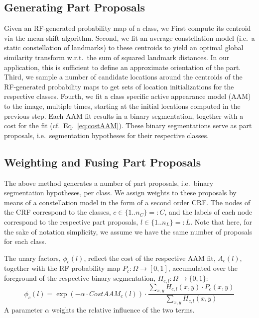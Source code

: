\documentclass[10pt,twocolumn,letterpaper]{article}
\begin{document}
\subsection{Generating Part Proposals}
\label{subsec:hyps}
%
Given an RF-generated probability map of a class, we
First compute its centroid via the mean shift algorithm. 
%
Second, we fit an average constellation model (i.e.\ a static constellation of landmarks) to these centroids to yield an optimal global similarity transform w.r.t.\ the sum of squared landmark distances. In our application, this is sufficient to define an approximate orientation of the part. 
%
Third, we sample a number of candidate locations around the centroids of the RF-generated probability maps to get sets of location initializations for the respective classes. 
%
Fourth, we fit a class specific active appearance model (AAM) to the image, multiple times, starting at the initial locations computed in the previous step. 
%
Each AAM fit results in a binary segmentation, together with a cost for the fit (cf.\ Eq.\ \eqref{eq:costAAM}). 
%
These binary segmentations serve as part proposals, i.e.\ segmentation hypotheses for their respective classes. 

\subsection{Weighting and Fusing Part Proposals}
\label{subsec:weightsAndFusion}

The above method generates a number of part proposals, i.e.\ binary segmentation hypotheses, per class. 
%
We assign weights to these proposals by means of a constellation model in the form of a second order CRF. 
%
The nodes of the CRF correspond to the classes, $c\in \{1..n_C\}=:C$, and the labels of each node correspond to the respective part proposals, $l\in \{1..n_L\}=:L$. 
Note that here, for the sake of notation simplicity, we assume we have the same number of proposals for each class. 

The unary factors, $\phi_c(l)$, reflect the cost of the respective AAM fit, $A_c(l)$, together with the RF probability map $P_c:\Omega\rightarrow [ 0,1 ]$, accumulated over the foreground of the respective binary segmentation, $H_{c,l}: \Omega\rightarrow \{0,1\}$: 
\begin{equation}
\phi_c(l) = \exp{(-\alpha\cdot CostAAM_c(l))} \cdot \frac{\sum_{x,y} H_{c,l}(x,y)\cdot P_c(x,y)}{\sum_{x,y} H_{c,l}(x,y)}
\label{eq:unaries}
\end{equation}
A parameter $\alpha$ weights the relative influence of the two terms. 
\end{document}
